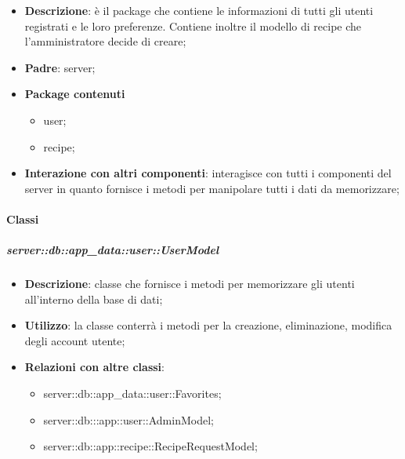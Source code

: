 	\begin{itemize}
		\item \textbf{Descrizione}: è il package che contiene le informazioni di tutti gli utenti registrati e le loro preferenze. Contiene inoltre il modello di recipe che l'amministratore decide di creare;
		\item \textbf{Padre}: server;
		\item \textbf{Package contenuti}
			\begin{itemize}
				\item user;
				\item recipe;
			\end{itemize}
		\item \textbf{Interazione con altri componenti}: interagisce con tutti i componenti del server in quanto fornisce i metodi per manipolare tutti i dati da memorizzare;
	\end{itemize}


	\paragraph{Classi} %

		\subparagraph{server::db::app\_data::user::UserModel} %
		\label{subp:server_db_app_data_user_user_model}
			\begin{itemize}
				\item \textbf{Descrizione}: classe che fornisce i metodi per memorizzare gli utenti all'interno della base di dati;
				\item \textbf{Utilizzo}: la classe conterrà i metodi per la creazione, eliminazione, modifica degli account utente;
				\item \textbf{Relazioni con altre classi}:
					\begin{itemize}
						\item server::db::app\_data::user::Favorites;
						\item server::db:::app\data::user::AdminModel;
						\item server::db::app\data::recipe::RecipeRequestModel;
					\end{itemize}
			\end{itemize}


